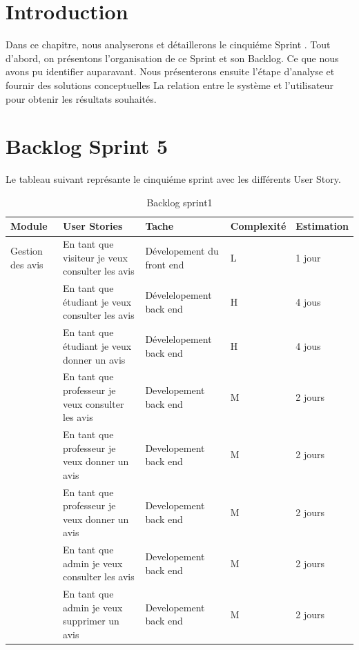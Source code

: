 \section{Introduction}
Dans ce chapitre, nous analyserons et détaillerons le cinquiéme Sprint . Tout d’abord, on présentons l’organisation de ce Sprint et son Backlog.
Ce que nous avons pu identifier auparavant. Nous présenterons ensuite l'étape d'analyse et fournir des solutions conceptuelles
La relation entre le système et l'utilisateur pour obtenir les résultats souhaités.

\section{Backlog Sprint 5}
Le tableau suivant représante le cinquiéme sprint avec les différents User Story.

\begin{table}[h]
    \begin{center} 
    \begin{tabular}{|p{3cm}|p{6cm}|p{3cm}|p{1.9cm}|p{2cm}|} \hline 
          Module &  User Stories &  Tache &  Complexité & Estimation \\ \hline
          Gestion des avis & En tant que visiteur je veux consulter les avis &Dévelopement du front end & \centering L &  1 jour  \\  \hline
          & En tant que étudiant je veux consulter les avis & Dévelelopement back end & \centering H & 4 jous \\ \hline
          & En tant que étudiant je veux donner un avis & Dévelelopement back end & \centering H & 4 jous \\ \hline
          & En tant que professeur je veux consulter les avis & Developement back end &  \centering M & 2 jours \\ \hline
          & En tant que professeur je veux donner un avis & Developement back end &  \centering M & 2 jours \\ \hline  
          & En tant que professeur je veux donner un avis & Developement back end &  \centering M & 2 jours \\ \hline  
          & En tant que admin je veux consulter les avis & Developement back end &  \centering M & 2 jours \\ \hline  
          & En tant que admin je veux supprimer un avis & Developement back end &  \centering M & 2 jours \\ \hline  
            
    \end{tabular}
  \end{center}
  \caption{ Backlog sprint1}
\label{tab:bert_res}
\end{table}



